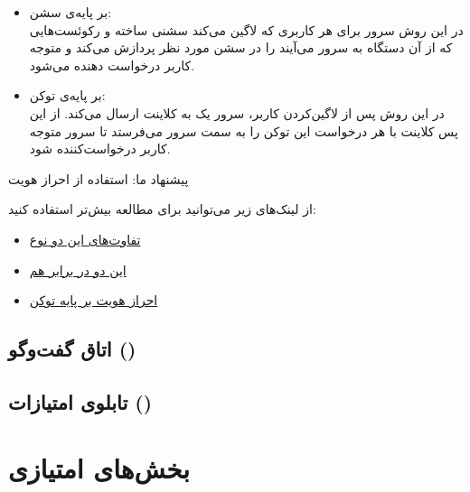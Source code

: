 \documentclass[]{article}
\begin{document}
\begin{itemize}
    \item بر پایه‌ی سشن: \\
    در این روش سرور برای هر کاربری که لاگین می‌کند سشنی ساخته و رکوئست‌هایی که از آن دستگاه به سرور می‌آیند را در سشن مورد نظر پردازش می‌کند و متوجه کاربر درخواست دهنده می‌شود.
    \item بر پایه‌ی توکن: \\
    در این روش پس از لاگین‌کردن کاربر، سرور یک  به کلاینت ارسال می‌کند. از این پس کلاینت با هر درخواست این توکن را به سمت سرور می‌فرستد تا سرور متوجه کاربر درخواست‌کننده شود.
\end{itemize}

پیشنهاد ما: استفاده از احراز هویت 

از لینک‌های زیر می‌توانید برای مطالعه بیش‌تر استفاده کنید:

\begin{itemize}
    \item \href{https://dev.to/thecodearcher/what-really-is-the-difference-between-session-and-token-based-authentication-2o39}{تفاوت‌های این دو نوع}
    \item \href{https://sherryhsu.medium.com/session-vs-token-based-authentication-11a6c5ac45e4}{این دو در برابر هم}
    \item \href{https://www.okta.com/identity-101/what-is-token-based-authentication/}{احراز هویت بر پایه توکن}
\end{itemize}

\subsection*{{\titr اتاق گفت‌وگو ()}}


\subsection*{{\titr تابلوی امتیازات ()}}




\section*{{\titr بخش‌های امتیازی}}
\end{document}
